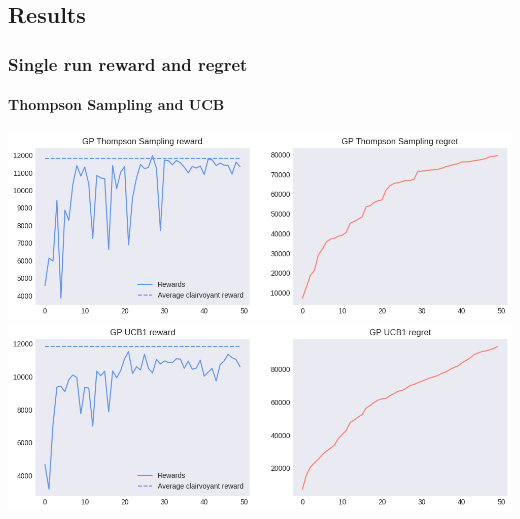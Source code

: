 
\subsection{Results}


\begin{frame}[plain]

\frametitle{Single run reward and regret}
\framesubtitle{Thompson Sampling and UCB}

\begin{center}
	\hspace*{-1em}
	\includegraphics[scale=0.42]{img/Graphs/uncertain_alpha_unit/image1.png}
	\hspace*{-1em}
	\includegraphics[scale=0.42]{img/Graphs/uncertain_alpha_unit/image2.png}
\end{center}

\end{frame}


